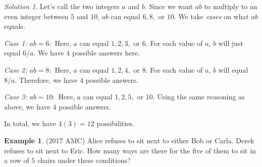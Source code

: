 \documentclass[l1pt]{article}
\theoremstyle{plain}
\theoremstyle{definition}
\newtheorem{example}[thm]{Example}
\theoremstyle{remark}
\newtheorem*{solution}{Solution}
\begin{document}
\begin{solution}


Let's call the two integers $a$ and $b$. Since we want $ab$ to multiply to an even integer between $5$ and $10$, $ab$ can equal $6, 8, $ or $10$. We take \textit{cases} on what $ab$ equals.
\newline

\textit{Case 1:} $ab=6:$ Here, $a$ can equal $1, 2, 3,$ or $6$. For each value of $a$, $b$ will just equal $6/a$. We have $4$ possible answers here.
\newline

\textit{Case 2:} $ab=8:$ Here, $a$ can equal $1, 2, 4,$ or $8$. For each value of $a$, $b$ will equal $8/a$. Therefore, we have $4$ possible answers.
\newline

\textit{Case 3:} $ab=10:$ Here, $a$ can equal $1, 2, 5,$ or $10$. Using the same reasoning as above, we have $4$ possible answers.
\newline

In total, we have $4(3)=12$ possibilities.
\end{solution}

\bigskip

\begin{example}
(2017 AMC) Alice refuses to sit next to either Bob or Carla. Derek refuses to sit next to Eric. How many ways are there for the five of them to sit in a row of $5$ chairs under these conditions?
\end{example}
\end{document}
